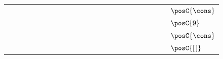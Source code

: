 {\begin{tabular}{ccccccccccccccccccccccc|l}
\gcell{$$} & \gcell{$\posC{\circ}$} & \gcell{$\posC{\circ}$} & \gcell{$\posC{\circ}$} & \gcell{$\posC{\circ}$} & \cellcolor{blue!10}\gcell{$\posC{\circ}$} & \gcell{$\posC{\circ}$} & \gcell{$\posC{\circ}$} & \gcell{$\posC{\circ}$} & \gcell{$$} & \gcell{$\posC{\circ}$} & \gcell{$\posC{\circ}$} & \gcell{$\posC{\circ}$} & \gcell{$\posC{\circ}$} & \gcell{$\posC{\circ}$} & \gcell{$\posC{\circ}$} & \gcell{$\posC{\circ}$} & \gcell{$\posC{\circ}$} & \gcell{$\posC{\circ}$} & \gcell{$\posC{\circ}$} & \gcell{$\posC{\circ}$} & \gcell{$$} & \gcell{$$} & \cellcolor{blue!10}$\posC{\cons}$ \\
\gcell{$$} & \gcell{$\posC{\circ}$} & \gcell{$\posC{\circ}$} & \gcell{$\posC{\circ}$} & \gcell{$\posC{\circ}$} & \cellcolor{blue!10}\gcell{$\posC{\circ}$} & \gcell{$\posC{\circ}$} & \gcell{$\posC{\circ}$} & \gcell{$\posC{\circ}$} & \gcell{$\posC{\circ}$} & \gcell{$\posC{\circ}$} & \gcell{$\posC{\circ}$} & \gcell{$\posC{\circ}$} & \gcell{$\posC{\circ}$} & \gcell{$\posC{\circ}$} & \gcell{$\posC{\circ}$} & \gcell{$\posC{\circ}$} & \gcell{$\posC{\circ}$} & \gcell{$\posC{\circ}$} & \gcell{$\posD{\bullet}$} & \gcell{$\posC{\circ}$} & \gcell{$$} & \gcell{$$} & \cellcolor{blue!10}$\posC{9}$ \\
\gcell{$$} & \gcell{$\posC{\circ}$} & \gcell{$\posC{\circ}$} & \gcell{$\posC{\circ}$} & \gcell{$\posC{\circ}$} & \cellcolor{blue!10}\gcell{$\posC{\circ}$} & \gcell{$\posC{\circ}$} & \gcell{$\posC{\circ}$} & \gcell{$\posC{\circ}$} & \gcell{$\posC{\circ}$} & \gcell{$\posC{\circ}$} & \gcell{$\posC{\circ}$} & \gcell{$\posC{\circ}$} & \gcell{$\posC{\circ}$} & \gcell{$\posC{\circ}$} & \gcell{$\posC{\circ}$} & \gcell{$\posC{\circ}$} & \gcell{$\posC{\circ}$} & \gcell{$\posC{\circ}$} & \gcell{$\posC{\circ}$} & \gcell{$\posC{\circ}$} & \gcell{$$} & \gcell{$$} & \cellcolor{blue!10}$\posC{\cons}$ \\
\gcell{$$} & \gcell{$\posC{\circ}$} & \gcell{$\posC{\circ}$} & \gcell{$\posC{\circ}$} & \gcell{$\posC{\circ}$} & \cellcolor{blue!10}\gcell{$\posC{\circ}$} & \gcell{$\posC{\circ}$} & \gcell{$\posC{\circ}$} & \gcell{$\posC{\circ}$} & \gcell{$\posC{\circ}$} & \gcell{$\posC{\circ}$} & \gcell{$\posC{\circ}$} & \gcell{$\posC{\circ}$} & \gcell{$\posC{\circ}$} & \gcell{$\posC{\circ}$} & \gcell{$\posC{\circ}$} & \gcell{$\posC{\circ}$} & \gcell{$\posC{\circ}$} & \gcell{$\posC{\circ}$} & \gcell{$\posC{\circ}$} & \gcell{$\posC{\circ}$} & \gcell{$\posC{\circ}$} & \gcell{$$} & \cellcolor{blue!10}$\posC{[\,]}$ \\
\end{tabular}}
